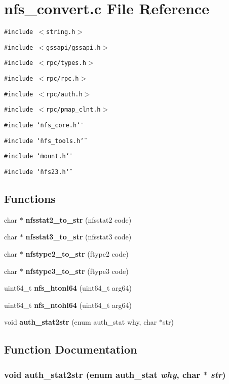 \section{nfs\_\-convert.c File Reference}
\label{nfs__convert_8c}
{\tt \#include $<$string.h$>$}\par
{\tt \#include $<$gssapi/gssapi.h$>$}\par
{\tt \#include $<$rpc/types.h$>$}\par
{\tt \#include $<$rpc/rpc.h$>$}\par
{\tt \#include $<$rpc/auth.h$>$}\par
{\tt \#include $<$rpc/pmap\_\-clnt.h$>$}\par
{\tt \#include \char`\"{}nfs\_\-core.h\char`\"{}}\par
{\tt \#include \char`\"{}nfs\_\-tools.h\char`\"{}}\par
{\tt \#include \char`\"{}mount.h\char`\"{}}\par
{\tt \#include \char`\"{}nfs23.h\char`\"{}}\par
\subsection*{Functions}
\begin{CompactItemize}
\item 
char $\ast$ {\bf nfsstat2\_\-to\_\-str} (nfsstat2 code)
\item 
char $\ast$ {\bf nfsstat3\_\-to\_\-str} (nfsstat3 code)
\item 
char $\ast$ {\bf nfstype2\_\-to\_\-str} (ftype2 code)
\item 
char $\ast$ {\bf nfstype3\_\-to\_\-str} (ftype3 code)
\item 
uint64\_\-t {\bf nfs\_\-htonl64} (uint64\_\-t arg64)
\item 
uint64\_\-t {\bf nfs\_\-ntohl64} (uint64\_\-t arg64)
\item 
void {\bf auth\_\-stat2str} (enum auth\_\-stat why, char $\ast$str)
\end{CompactItemize}


\subsection{Function Documentation}
\subsubsection{\setlength{\rightskip}{0pt plus 5cm}void auth\_\-stat2str (enum auth\_\-stat {\em why}, char $\ast$ {\em str})}\label{nfs__convert_8c_a6}


